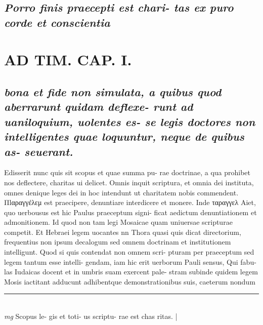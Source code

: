 \documentclass{article}
\begin{document}
\begin{pages}
\subsection*{\textit{Porro finis praecepti est chari- tas ex puro corde et conscientia }}
\section*{AD TIM. CAP. I. }
\marginpar{[ p.97 ]}
{}
\subsection*{\textit{bona et fide non simulata, a quibus quod aberrarunt quidam deflexe- runt ad uaniloquium, uolentes es- se legis doctores non intelligentes quae loquuntur, neque de quibus as- seuerant. }}\pstart Edisserit nunc quis sit scopus et quae summa pu- rae doctrinae, a qua prohibet nos deflectere, charitas ui delicet. Omnis inquit scriptura, et omnia dei instituta, omnes denique leges dei in hoc intendunt ut charitatem nobis commendent. Πlαραγγἐλεμ est praecipere, denuntiare interdicere et monere. Inde ταραγγελ Aiet, quo uerbousus est hic Paulus praeceptum signi- ficat aedictum denuntiationem et admonitionem. Id quod non tam legi Mosaicae quam uniuersae scripturae competit. Et Hebraei legem uocantes nn Thora quasi quis dicat directorium, frequentius non ipsum decalogum sed omnem doctrinam et institutionem intelligunt. Quod si quis contendat non omnem scri- pturam per praeceptum sed legem tantum esse intelli- gendam, iam hic erit uerborum Pauli sensus, Qui fabu- las Iudaicas docent et in umbris suam exercent pale- stram subinde quidem legem Mosis iactitant adducunt adhibentque demonstrationibus suis, caeterum nondum  \pend
\vspace{0.5cm}\noindent
\vspace{0.2cm}\rule{1cm}{0.2pt}\\ 
\hspace{0.2cm}\textit{mg}
\footnotesize Scopus le- gis et toti- us scriptu- rae est chas ritas. 
\normalsize| 

\end{pages}
\end{document}
